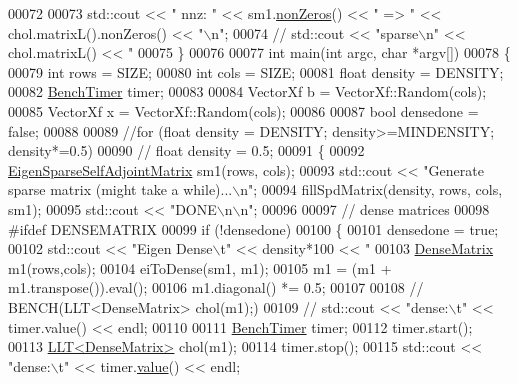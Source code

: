 \begin{DoxyCode}
00072 
00073   std::cout << \textcolor{stringliteral}{"  nnz: "} << sm1.\hyperlink{group___sparse_core___module_a03de8b3da2c142ce8698a76123b3e7d3}{nonZeros}() << \textcolor{stringliteral}{" => "} << chol.matrixL().nonZeros() << \textcolor{stringliteral}{"\(\backslash\)n"};
00074 \textcolor{comment}{//   std::cout << "sparse\(\backslash\)n" << chol.matrixL() << "%
00075 \}
00076 
00077 \textcolor{keywordtype}{int} main(\textcolor{keywordtype}{int} argc, \textcolor{keywordtype}{char} *argv[])
00078 \{
00079   \textcolor{keywordtype}{int} rows = SIZE;
00080   \textcolor{keywordtype}{int} cols = SIZE;
00081   \textcolor{keywordtype}{float} density = DENSITY;
00082   \hyperlink{class_eigen_1_1_bench_timer}{BenchTimer} timer;
00083 
00084   VectorXf b = VectorXf::Random(cols);
00085   VectorXf x = VectorXf::Random(cols);
00086 
00087   \textcolor{keywordtype}{bool} densedone = \textcolor{keyword}{false};
00088 
00089   \textcolor{comment}{//for (float density = DENSITY; density>=MINDENSITY; density*=0.5)}
00090 \textcolor{comment}{//   float density = 0.5;}
00091   \{
00092     \hyperlink{group___sparse_core___module_class_eigen_1_1_sparse_matrix}{EigenSparseSelfAdjointMatrix} sm1(rows, cols);
00093     std::cout << \textcolor{stringliteral}{"Generate sparse matrix (might take a while)...\(\backslash\)n"};
00094     fillSpdMatrix(density, rows, cols, sm1);
00095     std::cout << \textcolor{stringliteral}{"DONE\(\backslash\)n\(\backslash\)n"};
00096 
00097     \textcolor{comment}{// dense matrices}
00098 \textcolor{preprocessor}{    #ifdef DENSEMATRIX}
00099     \textcolor{keywordflow}{if} (!densedone)
00100     \{
00101       densedone = \textcolor{keyword}{true};
00102       std::cout << \textcolor{stringliteral}{"Eigen Dense\(\backslash\)t"} << density*100 << \textcolor{stringliteral}{"%
00103       \hyperlink{group___core___module}{DenseMatrix} m1(rows,cols);
00104       eiToDense(sm1, m1);
00105       m1 = (m1 + m1.transpose()).eval();
00106       m1.diagonal() *= 0.5;
00107 
00108 \textcolor{comment}{//       BENCH(LLT<DenseMatrix> chol(m1);)}
00109 \textcolor{comment}{//       std::cout << "dense:\(\backslash\)t" << timer.value() << endl;}
00110 
00111       \hyperlink{class_eigen_1_1_bench_timer}{BenchTimer} timer;
00112       timer.start();
00113       \hyperlink{group___cholesky___module_class_eigen_1_1_l_l_t}{LLT<DenseMatrix>} chol(m1);
00114       timer.stop();
00115       std::cout << \textcolor{stringliteral}{"dense:\(\backslash\)t"} << timer.\hyperlink{class_eigen_1_1_bench_timer_a26760f963ed8b64c126159bfea57735e}{value}() << endl;
}}
\end{DoxyCode}
